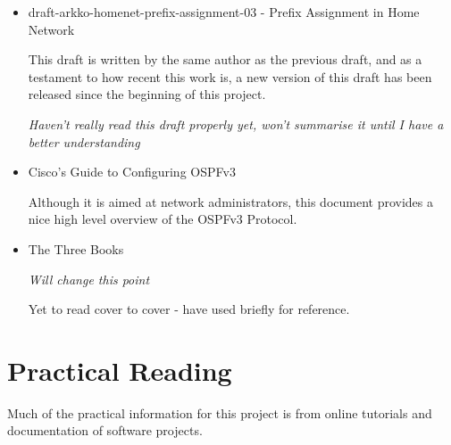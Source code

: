 \documentclass[12pt]{report}
\begin{document}
\begin{itemize}
	\item  draft-arkko-homenet-prefix-assignment-03 - Prefix Assignment in Home Network
 		
	This draft is written by the same author as the previous draft, and as a testament to how recent this work is, 
	a new version of this draft has been released since the beginning of this project. 
	
	\em Haven't really read this draft properly yet, won't summarise it until I have a better understanding \em


	\item Cisco's Guide to Configuring OSPFv3 
	
	Although it is aimed at network administrators, this document provides a nice high level overview of the OSPFv3 Protocol.

	\item The Three Books

	\em Will change this point \em 
	
	Yet to read cover to cover - have used briefly for reference. 
	

\end{itemize}

\section{Practical Reading}		

Much of the practical information for this project is from online tutorials and documentation of software projects.  
\end{document}
